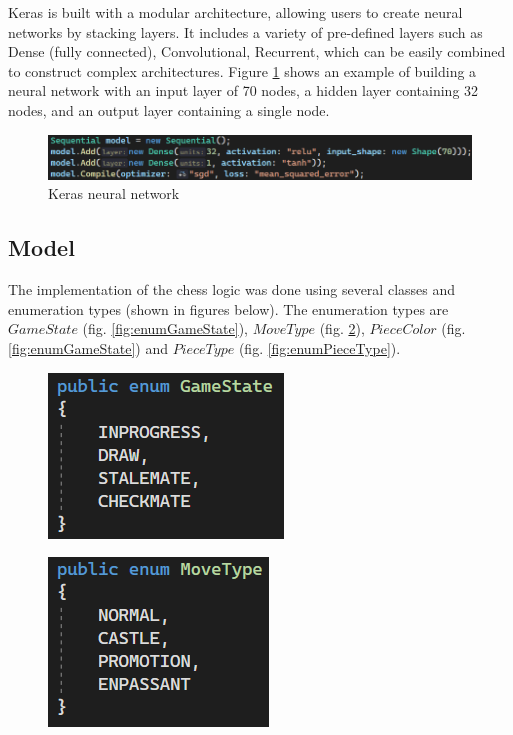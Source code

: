 Keras is built with a modular architecture, allowing users to create neural networks by stacking layers. It includes a variety of pre-defined layers such as Dense (fully connected), Convolutional, Recurrent, which can be easily combined to construct complex architectures. Figure \ref{fig:kerasModel} shows an example of building a neural network with an input layer of 70 nodes, a hidden layer containing 32 nodes, and an output layer containing a single node.

\begin{figure}[h]
    \centering
    \includegraphics[width=1\textwidth]{figures/keras-model.png}
    \caption{Keras neural network}
    \label{fig:kerasModel}
\end{figure}

\subsection{Model}
\label{subsec:ch5sec1subsec2}

The implementation of the chess logic was done using several classes and enumeration types (shown in figures below). The enumeration types are $GameState$ (fig. \ref{fig:enumGameState}), $MoveType$ (fig. \ref{fig:enumMoveType}), $PieceColor$ (fig. \ref{fig:enumGameState}) and $PieceType$ (fig. \ref{fig:enumPieceType}).

\begin{figure}[h]
    \centering
    \begin{minipage}{.49\textwidth}
      \centering
      \includegraphics{figures/enum-game-state.png}
      \label{fig:enumGameState}
    \end{minipage}
    \begin{minipage}{.49\textwidth}
      \centering
      \includegraphics{figures/enum-move-type.png}
      \label{fig:enumMoveType}
    \end{minipage}
\end{figure}

